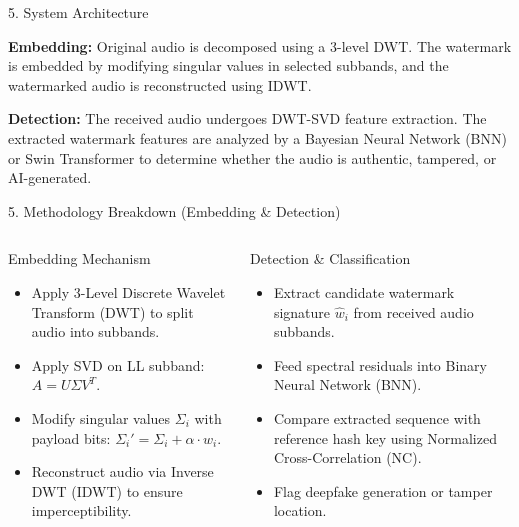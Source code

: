 \documentclass[10pt, aspectratio=169]{beamer}
\begin{document}
\begin{frame}{5. System Architecture}
\begin{center}
{
}
\end{center}

\vspace{0.3cm}

\textbf{Embedding:}
Original audio is decomposed using a 3-level DWT. The watermark is embedded by modifying singular values in selected subbands, and the watermarked audio is reconstructed using IDWT.

\vspace{0.2cm}

\textbf{Detection:}
The received audio undergoes DWT-SVD feature extraction. The extracted watermark features are analyzed by a Bayesian Neural Network (BNN) or Swin Transformer to determine whether the audio is authentic, tampered, or AI-generated.

\end{frame}

\begin{frame}{5. Methodology Breakdown (Embedding \& Detection)}
  \begin{columns}
      \begin{block}{Embedding Mechanism}
        \begin{itemize}
          \item Apply 3-Level Discrete Wavelet Transform (DWT) to split audio into subbands.
          \item Apply SVD on LL subband: $A = U \Sigma V^T$.
          \item Modify singular values $\Sigma_i$ with payload bits: $\Sigma_i' = \Sigma_i + \alpha \cdot w_i$.
          \item Reconstruct audio via Inverse DWT (IDWT) to ensure imperceptibility.
        \end{itemize}
      \end{block}

      \begin{block}{Detection \& Classification}
        \begin{itemize}
          \item Extract candidate watermark signature $\hat{w}_i$ from received audio subbands.
          \item Feed spectral residuals into Binary Neural Network (BNN).
          \item Compare extracted sequence with reference hash key using Normalized Cross-Correlation (NC).
          \item Flag deepfake generation or tamper location.
        \end{itemize}
      \end{block}
  \end{columns}
\end{frame}
\end{document}
